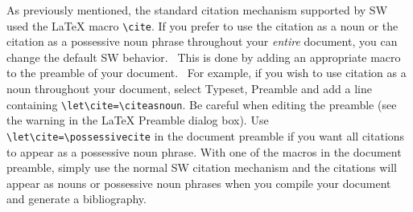 \documentclass{article}
\begin{document}
As previously mentioned, the standard citation mechanism supported by SW
used the LaTeX macro \verb|\cite|. If you prefer to use the citation as a
noun or the citation as a possessive noun phrase throughout your \emph{entire%
} document, you can change the default SW behavior. \ This is done by adding
an appropriate macro to the preamble of your document. \ For example, if you
wish to use citation as a noun throughout your document, select \textsf{%
Typeset, Preamble }and add a line containing \verb|\let\cite=\citeasnoun|.
Be careful when editing the preamble (see the warning in the LaTeX Preamble
dialog box). Use \verb|\let\cite=\possessivecite| in the document preamble
if you want all citations to appear as a possessive noun phrase. With one of
the macros in the document preamble, simply use the normal SW citation
mechanism and the citations will appear as nouns or possessive noun phrases
when you compile your document and generate a bibliography.



\end{document}
